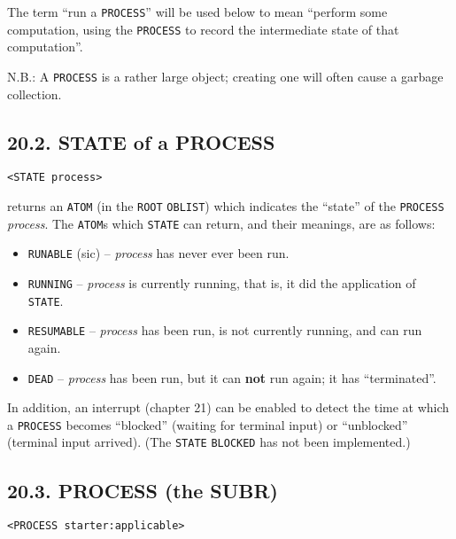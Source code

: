 \documentclass[a4paper,]{article}
\providecommand{\tightlist}{%
  \setlength{\itemsep}{0pt}\setlength{\parskip}{0pt}}
\begin{document}
The term ``run a \texttt{PROCESS}'' will be used below to mean ``perform some computation, using the \texttt{PROCESS} to
record the intermediate state of that computation''.

N.B.: A \texttt{PROCESS} is a rather large object; creating one will often cause a garbage collection.

\subsection{20.2. STATE of a PROCESS}\label{state-of-a-process}

\begin{verbatim}
<STATE process>
\end{verbatim}

 returns an \texttt{ATOM} (in the \texttt{ROOT} \texttt{OBLIST}) which indicates the ``state''
of the \texttt{PROCESS} \emph{process}. The \texttt{ATOM}s which \texttt{STATE} can return, and their meanings, are as
follows:

\begin{itemize}
\tightlist
\item
  \texttt{RUNABLE} (sic) -- \emph{process} has never ever been run.
\item
  \texttt{RUNNING} -- \emph{process} is currently running, that is, it did the application
  of \texttt{STATE}.
\item
  \texttt{RESUMABLE} -- \emph{process} has been run, is not currently running, and can run
  again.
\item
  \texttt{DEAD} -- \emph{process} has been run, but it can \textbf{not} run again; it has
  ``terminated''.
\end{itemize}

In addition, an interrupt (chapter 21) can be enabled to detect the time at which a \texttt{PROCESS} becomes ``blocked''
(waiting for terminal input) or ``unblocked'' (terminal input arrived). (The \texttt{STATE}
\texttt{BLOCKED} has not been implemented.)

\subsection{20.3. PROCESS (the SUBR)}\label{process-the-subr}

\begin{verbatim}
<PROCESS starter:applicable>
\end{verbatim}
\end{document}
